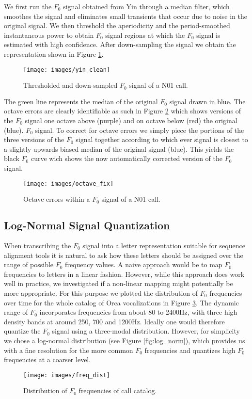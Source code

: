 We first run the $F_0$ signal obtained from Yin through a median filter, 
which smoothes the signal and eliminates small transients that occur due
to noise in the original signal. We then threshold the aperiodicity and the
period-smoothed instantaneous power to obtain $F_0$ signal regions at which
the $F_0$ signal is estimated with high confidence. After down-sampling the
signal we obtain the representation shown in Figure
\ref{fig:clean_yin}.

\begin{figure}[h]
\centering
\texttt{[image: images/yin\_clean]}
\caption{Thresholded and down-sampled $F_0$ signal of a N01 call.}
\label{fig:clean_yin}
\end{figure}

The green line represents the median of the original $F_0$ signal
drawn in blue. The octave errors are clearly identifiable as such in
Figure \ref{fig:octave_yin} which shows versions of the $F_0$ signal
one octave above (purple) and on octave below (red) the original
(blue).  $F_0$ signal. To correct for octave errors we simply piece
the portions of the three versions of the $F_0$ signal together
according to which ever signal is closest to a slightly upwards biased
median of the original signal (blue). This yields the black $F_0$
curve wich shows the now automatically corrected version of the $F_0$
signal.
\begin{figure}[h]
\centering
\texttt{[image: images/octave\_fix]}
\caption{Octave errors within a $F_0$ signal of a N01 call.}
\label{fig:octave_yin}
\end{figure}

\subsection{Log-Normal Signal Quantization}
When transcribing the $F_0$ signal into a letter representation suitable 
for sequence alignment tools it is natural to ask how these letters should be
assigned over the range of possible $F_0$ frequency values. A naive approach
would be to map $F_0$ frequencies to letters in a linear fashion. However, while
this approach does work well in practice, we investigated if a non-linear mapping
might potentially be more appropriate. For this purpose we plotted
the distribution of $F_0$ frequencies over time for the whole catalog of
Orca vocalizations in Figure \ref{fig:freq_dist}. The dynamic range of
$F_0$ incorporates frequencies from about 80 to 2400Hz, with three high density bands
at around 250, 700 and 1200Hz. Ideally one would therefore quantize the $F_0$ signal
using a three-modal distribution. However, for simplicity we chose a log-normal 
distribution (see Figure \ref{fig:log_norm}), which provides us with a fine resolution
for the more common $F_0$ frequencies and quantizes high $F_0$ frequencies at a coarser level.
\begin{figure}[h]
\centering
\texttt{[image: images/freq\_dist]}
\caption{Distribution of $F_0$ frequencies of call catalog.}
\label{fig:freq_dist}
\end{figure}

